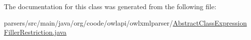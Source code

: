 The documentation for this class was generated from the following file\-:\begin{DoxyCompactItemize}
\item 
parsers/src/main/java/org/coode/owlapi/owlxmlparser/\hyperlink{_abstract_class_expression_filler_restriction_8java}{Abstract\-Class\-Expression\-Filler\-Restriction.\-java}\end{DoxyCompactItemize}
